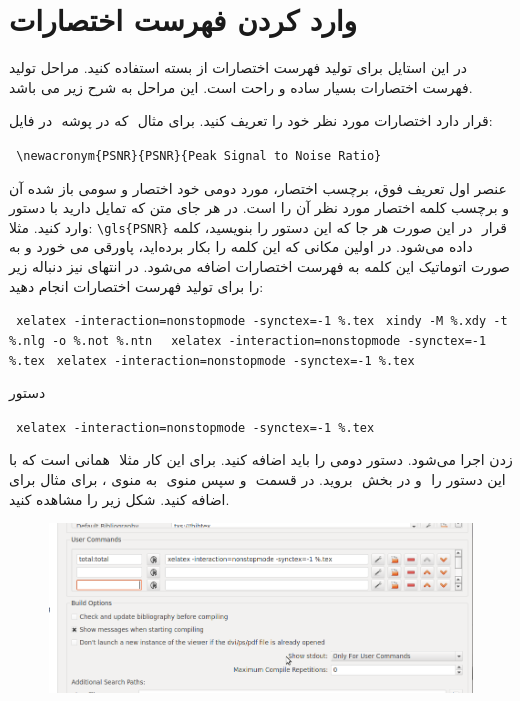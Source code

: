 \chapter{وارد کردن فهرست اختصارات}
در این استایل برای تولید فهرست اختصارات از بسته {} استفاده کنید. مراحل تولید فهرست اختصارات بسیار ساده و راحت است. این مراحل به شرح زیر می باشد. 
\begin{itemize}
\arcm
در فایل  ‎‎ که در پوشه ‎‎ قرار دارد اختصارات مورد نظر خود را تعریف کنید. برای مثال:
\begin{latin}
\verb+ \newacronym{PSNR}{PSNR}{Peak Signal to Noise Ratio}+
\end{latin}

عنصر اول تعریف فوق، برچسب اختصار، مورد دومی خود اختصار و سومی باز شده آن است. 
\arcm
در هر جای متن که تمایل دارید با دستور  ‎‎‌و برچسب کلمه اختصار مورد نظر آن را وارد کنید. مثلا:
\verb+\gls{PSNR}+
در این صورت هر جا که این دستور را بنویسید، کلمه ‎‎‌ قرار داده می‌شود. در اولین مکانی که این کلمه را بکار برده‌اید، پاورقی می خورد و به صورت اتوماتیک این کلمه به فهرست اختصارات اضافه می‌شود.
\arcm
در انتهای نیز دنباله زیر را برای تولید فهرست اختصارات انجام دهید:
\begin{LTR}
\begin{itemize}
\tree
\verb+ xelatex -interaction=nonstopmode -synctex=-1 %.tex+
\tree
\verb+ xindy -M %.xdy -t %.nlg -o %.not %.ntn +
\tree
\verb+ xelatex -interaction=nonstopmode -synctex=-1 %.tex+
\tree
\verb+ xelatex -interaction=nonstopmode -synctex=-1 %.tex+
\end{itemize}
\end{LTR}
\end{itemize}
دستور 
\begin{LTR}
\verb+ xelatex -interaction=nonstopmode -synctex=-1 %.tex+
\end{LTR}

همانی است که با   ‎‎ زدن اجرا می‌شود. دستور دومی را باید اضافه کنید. برای این کار مثلا برای مثال برای ‎‎، به منوی ‎‎ و سپس منوی ‎‎ بروید. در قسمت ‎‎ و در بخش ‎‎ این دستور را اضافه کنید. شکل زیر را مشاهده کنید. 
\begin{figure}[H]
\includegraphics[width=0.9\linewidth]{../Pic/a}
\end{figure}

